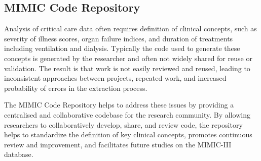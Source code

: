 \documentclass{bioinfo}
\begin{document}

\subsection{MIMIC Code Repository}

Analysis of critical care data often requires definition of clinical concepts, such as severity of illness scores, organ failure indices, and duration of treatments including ventilation and dialysis. Typically the code used to generate these concepts is generated by the researcher and often not widely shared for reuse or validation. The result is that work is not easily reviewed and reused, leading to inconsistent approaches between projects, repeated work, and increased probability of errors in the extraction process. 

The MIMIC Code Repository helps to address these issues by providing a centralised and collaborative codebase for the research community. By allowing researchers to collaboratively develop, share, and review code, the repository helps to standardize the definition of key clinical concepts, promotes continuous review and improvement, and facilitates future studies on the MIMIC-III database. 
\end{document}
